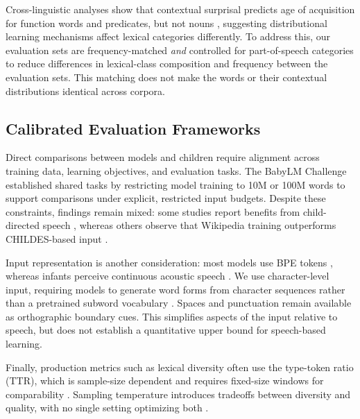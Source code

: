 
Cross-linguistic analyses show that contextual surprisal predicts age of acquisition for function words and predicates, but not nouns \citep{portelance2023predicting}, suggesting distributional learning mechanisms affect lexical categories differently. To address this, our evaluation sets are frequency-matched \emph{and} controlled for part-of-speech categories to reduce differences in lexical-class composition and frequency between the evaluation sets. This matching does not make the words or their contextual distributions identical across corpora.



\subsection{Calibrated Evaluation Frameworks}

Direct comparisons between models and children require alignment across training data, learning objectives, and evaluation tasks\citep{warstadt2022what}. The BabyLM Challenge \citep{warstadt2023findings,hu2024findings,charpentier2025findings} established shared tasks by restricting model training to 10M or 100M words to support comparisons under explicit, restricted input budgets. Despite these constraints, findings remain mixed: some studies report benefits from child-directed speech \citep{feng2024child}, whereas others observe that Wikipedia training outperforms CHILDES-based input \citep{padovani2025child}.

Input representation is another consideration: most models use BPE tokens \citep{huebner2021babyberta,evanson2023language}, whereas infants perceive continuous acoustic speech \citep{dupoux2018cognitive}. We use character-level input, requiring models to generate word forms from character sequences rather than a pretrained subword vocabulary \citep{bunzeck2024graphemes,goriely2024babble}. Spaces and punctuation remain available as orthographic boundary cues. This simplifies aspects of the input relative to speech, but does not establish a quantitative upper bound for speech-based learning.


Finally, production metrics such as lexical diversity often use the type-token ratio (TTR), which is sample-size dependent \citep{richards1987type} and requires fixed-size windows for comparability \citep{mckee2022measurement}. Sampling temperature introduces tradeoffs between diversity and quality, with no single setting optimizing both \citep{verine2025improving}. 


